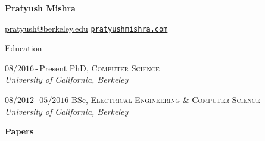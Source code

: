 \documentclass[11pt]{article}
\begin{document}
% 
\begin{cv}{\vspace{-5em}}
  \begin{center}
    \huge
    \textbf{Pratyush Mishra}
  \end{center}

  \href{mailto:pratyush@berkeley.edu}{pratyush@berkeley.edu}\hfill
  \href{http://www.pratyushmishra.com}{\texttt{pratyushmishra.com}}

  \begin{cvlist}{Education}
  \item[\small$08/2016$\,-\,Present] PhD, \textsc{Computer Science}\\
    \emph{University of California, Berkeley}

  \item[\small$08/2012$\,-\,$05/2016$] BSc, \textsc{Electrical Engineering \& Computer Science}\\
    \emph{University of California, Berkeley}
  \end{cvlist}
  \vspace{-1em}
  {\large\textbf{Papers}}

  {
    \small
    \noindent
    \vspace{-2em}
  }


\end{cv}
\end{document}
